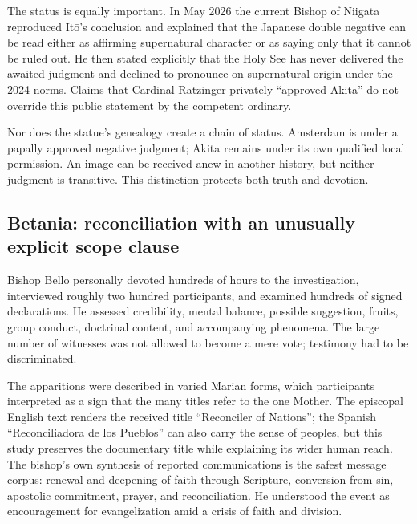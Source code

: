 The status is equally important. In May 2026 the current Bishop of Niigata reproduced Itō's conclusion and explained that the Japanese double negative can be read either as affirming supernatural character or as saying only that it cannot be ruled out. He then stated explicitly that the Holy See has never delivered the awaited judgment and declined to pronounce on supernatural origin under the 2024 norms. Claims that Cardinal Ratzinger privately ``approved Akita'' do not override this public statement by the competent ordinary.

Nor does the statue's genealogy create a chain of status. Amsterdam is under a papally approved negative judgment; Akita remains under its own qualified local permission. An image can be received anew in another history, but neither judgment is transitive. This distinction protects both truth and devotion.

\subsection{Betania: reconciliation with an unusually explicit scope clause}


Bishop Bello personally devoted hundreds of hours to the investigation, interviewed roughly two hundred participants, and examined hundreds of signed declarations. He assessed credibility, mental balance, possible suggestion, fruits, group conduct, doctrinal content, and accompanying phenomena. The large number of witnesses was not allowed to become a mere vote; testimony had to be discriminated.

The apparitions were described in varied Marian forms, which participants interpreted as a sign that the many titles refer to the one Mother. The episcopal English text renders the received title ``Reconciler of Nations''; the Spanish ``Reconciliadora de los Pueblos'' can also carry the sense of peoples, but this study preserves the documentary title while explaining its wider human reach. The bishop's own synthesis of reported communications is the safest message corpus: renewal and deepening of faith through Scripture, conversion from sin, apostolic commitment, prayer, and reconciliation. He understood the event as encouragement for evangelization amid a crisis of faith and division.

